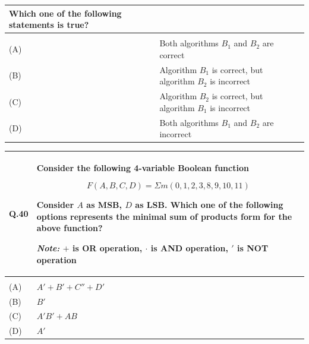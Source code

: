 \documentclass[14pt]{article}
\renewcommand{\arraystretch}{1.25}
\begin{document}
\begin{tabular}{|p{1.5cm}|p{12cm}|}
{Which one of the following statements is true?

\vspace{0.3cm}
}
\\
\hline

& \\[-0.2cm]
\hline

(A) & Both algorithms $B_1$ and $B_2$ are correct \\[0.25cm]
\hline

(B) & Algorithm $B_1$ is correct, but algorithm $B_2$ is incorrect \\[0.25cm]
\hline

(C) & Algorithm $B_2$ is correct, but algorithm $B_1$ is incorrect \\[0.25cm]
\hline

(D) & Both algorithms $B_1$ and $B_2$ are incorrect \\[0.25cm]
\hline

\end{tabular}

\renewcommand{\arraystretch}{1}

\vspace{0.3cm}

\renewcommand{\arraystretch}{1.25}

\begin{tabular}{|p{1.5cm}|p{12cm}|}
\hline

Q.40 &
\parbox[t]{\linewidth}{
\strut
Consider the following 4-variable Boolean function

\[
F(A,B,C,D)=\Sigma m(0,1,2,3,8,9,10,11)
\]

Consider $A$ as MSB, $D$ as LSB. Which one of the following options
represents the minimal sum of products form for the above function?

\vspace{0.2cm}

\textit{Note:} $+$ is OR operation, $\cdot$ is AND operation,
$'$ is NOT operation

\vspace{0.35cm}
}
\\
\hline

& \\[-0.2cm]
\hline

(A) & $A' + B' + C'' + D'$ \\[0.25cm]
\hline

(B) & $B'$ \\[0.25cm]
\hline

(C) & $A'B' + AB$ \\[0.25cm]
\hline

(D) & $A'$ \\[0.25cm]
\hline

\end{tabular}
\end{document}
